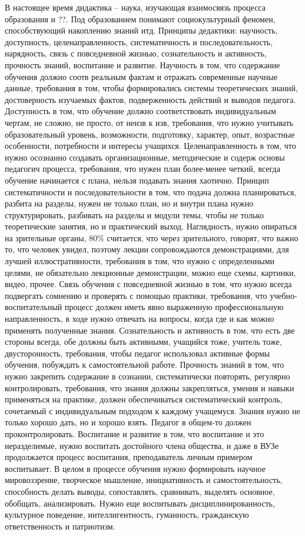 \documentclass[a4paper, 12pt]{article}
\begin{document}
В настоящее время дидактика -- наука, изучающая взаимосвязь процесса 
образования и ??. Под образованием понимают социокультурный феномен, 
способствующий накоплению знаний итд. Принципы дедактики: научность, 
доступность, целенаправленность, систематичность и последовательность, 
нарядность, связь с повседневной жизнью, сознательность и активность, 
прочность знаний, воспитание и развитие. Научность в том, что содержание 
обучения должно соотв реальным фактам и отражать современные научные 
данные, требования в том, чтобы формировались системы теоретических 
знаний, достоверность изучаемых фактов, подверженность действий 
и выводов педагога. Доступность в том, что обучение должно 
соответствовать индивидуальным чертам, не сложно, не просто, от неизв 
к изв, требования, что нужно учитывать образовательный уровень, 
возможности, подготовку, характер, опыт, возрастные особенности, 
потребности и интересы учащихся. Целенаправленность в том, что нужно 
осознанно создавать организационные, методические и содерж основы 
педагогич процесса, требования, что нужен план более-менее четкий, 
всегда обучение начинается с плана, нельзя подавать знания хаотично. 
Принцип систематичности и последовательности в том, что подача должна 
планироваться, разбита на разделы, нужен не только план, но и внутри 
плана нужно структурировать, разбивать на разделы и модули темы, чтобы 
не только теоретические занятия, но и практический выход. Наглядность, 
нужно опираться на зрительные органы, 80\% считается, что через 
зрительного, говорят, что важно то, что человек увидел, поэтому лекции 
сопровождаются демонстрациями, для лучшей иллюстративности, требования 
в том, что нужно с определенными целями, не обязательно лекционные 
демонстрации, можно еще схемы, картинки, видео, прочее. Связь обучения 
с повседневной жизнью в том, что нужно всегда подвергать сомнению 
и проверять с помощью практики, требования, что учебно-воспитательный 
процесс должен иметь явно выраженную профессиональную направленность, 
в ходе нужно отвечать на вопросы, когда где и как можно применять 
полученные знания. Сознательность и активность в том, что есть две 
стороны всегда, обе должны быть активными, учащийся тоже, учитель тоже, 
двусторонность, требования, чтобы педагог использовал активные формы 
обучения, побуждать к самостоятельной работе. Прочность знаний в том, 
что нужно закрепить содержание в сознании, систематически повторять, 
регулярно контролировать, требования, что знания должны закрепляться, 
умения и навыки применяться на практике, должен обеспечиваться 
систематический контроль, сочетаемый с индивидуальным подходом к каждому 
учащемуся. Знания нужно не только хорошо дать, но и хорошо взять. 
Педагог в общем-то должен проконтролировать. Воспитание и развитие 
в том, что воспитание и это неразделимые, нужно воспитать достойного 
члена общества, и даже в ВУЗе продолжается процесс воспитания, 
преподаватель личным примером воспитывает. В целом в процессе обучения 
нужно формировать научное мировоззрение, творческое мышление, 
инициативность и самостоятельность, способность делать выводы, 
сопоставлять, сравнивать, выделять основное, обобщать, анализировать. 
Нужно еще воспитывать дисциплинированность, культурное поведение, 
интеллигентность, гуманность, гражданскую ответственность и патриотизм. 
\end{document}
